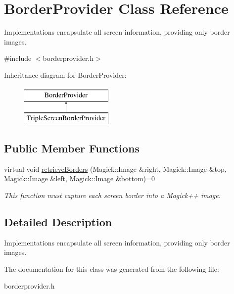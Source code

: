 \hypertarget{classBorderProvider}{}\section{Border\+Provider Class Reference}
\label{classBorderProvider}


Implementations encapsulate all screen information, providing only border images.  




{\ttfamily \#include $<$borderprovider.\+h$>$}

Inheritance diagram for Border\+Provider\+:\begin{figure}[H]
\begin{center}
\leavevmode
\includegraphics[height=2.000000cm]{classBorderProvider}
\end{center}
\end{figure}
\subsection*{Public Member Functions}
\begin{DoxyCompactItemize}
\item 
virtual void \hyperlink{classBorderProvider_afdad2b6203baadf45a4e7b7d243bdca9}{retrieve\+Borders} (Magick\+::\+Image \&right, Magick\+::\+Image \&top, Magick\+::\+Image \&left, Magick\+::\+Image \&bottom)=0\hypertarget{classBorderProvider_afdad2b6203baadf45a4e7b7d243bdca9}{}\label{classBorderProvider_afdad2b6203baadf45a4e7b7d243bdca9}

\begin{DoxyCompactList}\small\item\em This function must capture each screen border into a Magick++ image. \end{DoxyCompactList}\end{DoxyCompactItemize}


\subsection{Detailed Description}
Implementations encapsulate all screen information, providing only border images. 

The documentation for this class was generated from the following file\+:\begin{DoxyCompactItemize}
\item 
borderprovider.\+h\end{DoxyCompactItemize}
